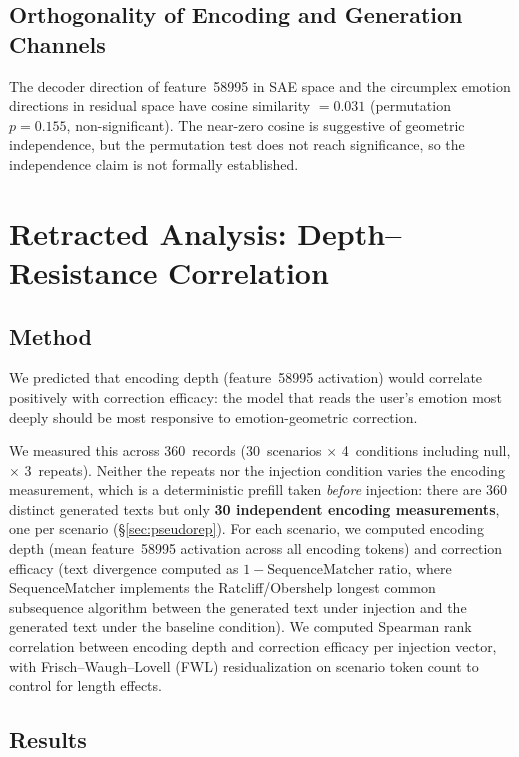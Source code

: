 \documentclass[11pt,a4paper]{article}
\begin{document}
\subsection{Orthogonality of Encoding and Generation Channels}

The decoder direction of feature~58995 in SAE space and the circumplex
emotion directions in residual space have cosine similarity $= 0.031$
(permutation $p{=}0.155$, non-significant). The near-zero cosine is
suggestive of geometric independence, but the permutation test does not
reach significance, so the independence claim is not formally
established.

\section{Retracted Analysis: Depth--Resistance Correlation}
\label{sec:retracted}
\label{sec:resistance}

\subsection{Method}

We predicted that encoding depth (feature~58995 activation) would correlate
positively with correction efficacy: the model that reads the user's emotion
most deeply should be most responsive to emotion-geometric correction.

We measured this across 360~records (30~scenarios $\times$ 4~conditions
including null, $\times$ 3~repeats). Neither the repeats nor the injection
condition varies the encoding measurement, which is a deterministic prefill
taken \emph{before} injection: there are
360 distinct generated texts but only \textbf{30 independent encoding
measurements}, one per scenario (\S\ref{sec:pseudorep}). For each scenario, we
computed encoding depth (mean feature~58995 activation across all encoding
tokens) and correction efficacy (text divergence computed as $1 - \text{SequenceMatcher
ratio}$, where SequenceMatcher implements the Ratcliff/Obershelp longest
common subsequence algorithm between the generated text under injection and
the generated text under the baseline condition).
We computed Spearman rank correlation between encoding depth and correction
efficacy per injection vector, with Frisch--Waugh--Lovell (FWL) residualization on scenario token
count to control for length effects.

\subsection{Results}
\end{document}
